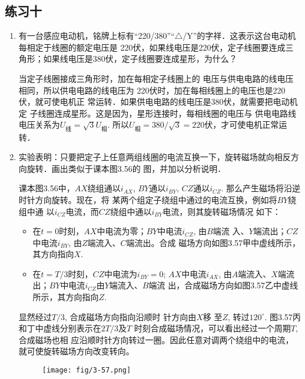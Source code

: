 \subsection{练习十}
\begin{enumerate}
    \item 有一台感应电动机，铭牌上标有“220/380”“$\triangle$/Y”的字祥．这表示这台电动机每相定于线圈的额定电压是 220伏，如果线电压是220伏，定子线圈要连成三角形；如果线电压是380伏，定子线圈要连成星形，为什么？


    \begin{solution}
当定子线圈接成三角形时，加在每相定子线圈上的
电压与供电电路的线电压相同，所以供电电路的线电压为
220伏时，加在每相线圈上的电压也是220伏，就可使电机正
常运转．如果供电电路的线电压是380伏，就需要把电动机定
子线圈连成星形。这是因为，星形连接时，每相线圈的电压与
供电电路线电压关系为$U_{\text{线}}=\sqrt{3}U_{\text{相}}$. 所以$U_{\text{相}}=380/\sqrt{3}=220$伏，才可使电机正常运转．
    \end{solution}
    
    \item 实验表明：只要把定子上任意两组线圈的电流互换一下，旋转磁场就向相反方向旋转．画出类似于课本图3.56的
    图，并加以分析说明．


    \begin{solution}
    课本图3.56中，$AX$绕组通以$i_{AX}$, $BY$通以$i_{BY}$,
$CZ$通以$i_{CZ}$. 那么产生磁场将沿逆时针方向旋转。现在，将
某两个组定子绕组中通过的电流互换，例如将$BY$绕组中通
以$i_{CZ}$电流，而$CZ$绕组中通以$i_{BY}$电流，则其旋转磁场情况
如下：
\begin{itemize}
\item 在$t=0$时刻，$AX$中电流为零；$BY$中电流$i_{CZ}$, 由$B$端流
入、$Y$端流出；$CZ$中电流$i_{BY}$, 由$Z$端流入、$C$端流出。合成
磁场方向如图3.57甲中虚线所示，其方向指向$X$.

\item 在$t=T/3$时刻，$CZ$中电流为$i_{BY}=0$; $AX$中电流$i_{AX}$, 
由$A$端流入、$X$端流出；$BY$中电流$i_{CZ}$由$Y$端流入、$B$端流
出，合成磁场方向如图3.57乙中虚线所示，其方向指向$Z$.
\end{itemize}

显然经过$T/3$, 合成磁场方向指向沿顺时 针方向由$X$移
至$Z$, 转过$120^{\circ}$. 图3.57丙和丁中虚线分别表示在$2T/3$及$T$
时刻合成磁场情况，可以看出经过一个周期$T$, 合成磁场也相
应沿顺时针方向转过一圈。因此任意对调两个绕组中的电流，
就可使旋转磁场方向改变转向。
\begin{figure}[htp]
    \centering
    \texttt{[image: fig/3-57.png]}
    \caption{}
\end{figure}
    \end{solution}
    

\end{enumerate}
